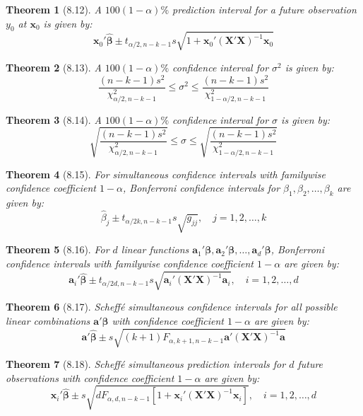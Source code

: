 \documentclass{article}
\newtheorem{theorem}{Theorem}[section]
\begin{document}
\begin{theorem}[8.12]
A $100(1-\alpha)\%$ prediction interval for a future observation $y_0$ at $\mathbf{x}_0$ is given by:
\[\mathbf{x}_0'\hat{\boldsymbol{\beta}} \pm t_{\alpha/2,n-k-1}s\sqrt{1 + \mathbf{x}_0'(\mathbf{X}'\mathbf{X})^{-1}\mathbf{x}_0}\]
\end{theorem}

\begin{theorem}[8.13]
A $100(1-\alpha)\%$ confidence interval for $\sigma^2$ is given by:
\[\frac{(n-k-1)s^2}{\chi^2_{\alpha/2,n-k-1}} \leq \sigma^2 \leq \frac{(n-k-1)s^2}{\chi^2_{1-\alpha/2,n-k-1}}\]
\end{theorem}

\begin{theorem}[8.14]
A $100(1-\alpha)\%$ confidence interval for $\sigma$ is given by:
\[\sqrt{\frac{(n-k-1)s^2}{\chi^2_{\alpha/2,n-k-1}}} \leq \sigma \leq \sqrt{\frac{(n-k-1)s^2}{\chi^2_{1-\alpha/2,n-k-1}}}\]
\end{theorem}

\begin{theorem}[8.15]
For simultaneous confidence intervals with familywise confidence coefficient $1-\alpha$, Bonferroni confidence intervals for $\beta_1,\beta_2,\ldots,\beta_k$ are given by:
\[\hat{\beta}_j \pm t_{\alpha/2k,n-k-1}s\sqrt{g_{jj}}, \quad j=1,2,\ldots,k\]
\end{theorem}

\begin{theorem}[8.16]
For $d$ linear functions $\mathbf{a}_1'\boldsymbol{\beta}, \mathbf{a}_2'\boldsymbol{\beta},\ldots,\mathbf{a}_d'\boldsymbol{\beta}$, Bonferroni confidence intervals with familywise confidence coefficient $1-\alpha$ are given by:
\[\mathbf{a}_i'\hat{\boldsymbol{\beta}} \pm t_{\alpha/2d,n-k-1}s\sqrt{\mathbf{a}_i'(\mathbf{X}'\mathbf{X})^{-1}\mathbf{a}_i}, \quad i=1,2,\ldots,d\]
\end{theorem}

\begin{theorem}[8.17]
Scheffé simultaneous confidence intervals for all possible linear combinations $\mathbf{a}'\boldsymbol{\beta}$ with confidence coefficient $1-\alpha$ are given by:
\[\mathbf{a}'\hat{\boldsymbol{\beta}} \pm s\sqrt{(k+1)F_{\alpha,k+1,n-k-1}\mathbf{a}'(\mathbf{X}'\mathbf{X})^{-1}\mathbf{a}}\]
\end{theorem}

\begin{theorem}[8.18]
Scheffé simultaneous prediction intervals for $d$ future observations with confidence coefficient $1-\alpha$ are given by:
\[\mathbf{x}_i'\hat{\boldsymbol{\beta}} \pm s\sqrt{dF_{\alpha,d,n-k-1}[1 + \mathbf{x}_i'(\mathbf{X}'\mathbf{X})^{-1}\mathbf{x}_i]}, \quad i=1,2,\ldots,d\]
\end{theorem}
\end{document}
